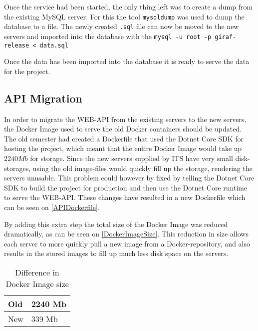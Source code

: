 Once the service had been started, the only thing left was to create a dump from the existing MySQL server.
For this the tool \lstinline$mysqldump$ was used to dump the database to a file.
The newly created \lstinline$.sql$ file can now be moved to the new servers and imported into the database with the \lstinline$mysql -u root -p giraf-release < data.sql$

Once the data has been imported into the database it is ready to serve the data for the project.

\subsection{API Migration}
In order to migrate the WEB-API from the existing servers to the new servers, the Docker Image used to serve the old Docker containers should be updated.
The old semester had created a Dockerfile that used the Dotnet Core SDK for hosting the project, which meant that the entire Docker Image would take up $2240 Mb$ for storage.
Since the new servers supplied by ITS have very small disk-storages, using the old image-files would quickly fill up the storage, rendering the servers unusable.
This problem could however by fixed by telling the Dotnet Core SDK to build the project for production and then use the Dotnet Core runtime to serve the WEB-API.
These changes have resulted in a new Dockerfile which can be seen on \autoref{APIDockerfile}.

By adding this extra step the total size of the Docker Image was reduced dramatically, as can be seen on \autoref{DockerImageSize}.
This reduction in size allows each server to more quickly pull a new image from a Docker-repository, and also results in the stored images to fill up much less disk space on the servers.

\begin{table}[H]
\centering
\begin{tabular}{|l|l|}
\hline
Old & 2240 Mb \\ \hline
New &  339 Mb  \\ \hline
\end{tabular}
\caption{Difference in Docker Image size}
\label{DockerImageSize}
\end{table}


